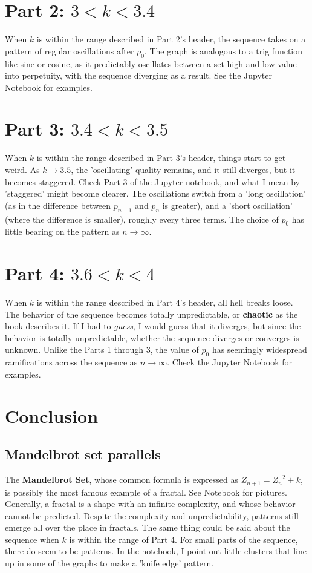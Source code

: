 \documentclass{article}
\begin{document}
\section*{Part 2: $3 < k < 3.4$}
When $k$ is within the range described in Part 2's header, the sequence takes on a pattern of regular oscillations after $p_0$. The graph is analogous to a trig function like sine or cosine, as it predictably oscillates between a set high and low value into perpetuity, with the sequence diverging as a result. See the Jupyter Notebook for examples.
\section*{Part 3: $3.4 < k < 3.5$}
When $k$ is within the range described in Part 3's header, things start to get weird. As $k \rightarrow 3.5$, the 'oscillating' quality remains, and it still diverges, but it becomes staggered. Check Part 3 of the Jupyter notebook, and what I mean by 'staggered' might become clearer. The oscillations switch from a 'long oscillation' (as in the difference between $p_{n+1}$ and $p_n$ is greater), and a 'short oscillation' (where the difference is smaller), roughly every three terms. The choice of $p_0$ has little bearing on the pattern as $n \rightarrow \infty$.
\section*{Part 4: $3.6 < k < 4$}
When $k$ is within the range described in Part 4's header, all hell breaks loose. The behavior of the sequence becomes totally unpredictable, or \textbf{chaotic} as the book describes it. If I had to \textit{guess}, I would guess that it diverges, but since the behavior is totally unpredictable, whether the sequence diverges or converges is unknown. Unlike the Parts 1 through 3, the value of $p_0$ has seemingly widespread ramifications across the sequence as $n \rightarrow \infty$. Check the Jupyter Notebook for examples. 
\section*{Conclusion}
\subsection*{Mandelbrot set parallels}
The \textbf{Mandelbrot Set}, whose common formula is expressed as $Z_{n+1}={Z_n}^2+k$, is possibly the most famous example of a fractal. See Notebook for pictures. Generally, a fractal is a shape with an infinite complexity, and whose behavior cannot be predicted. Despite the complexity and unpredictability, patterns still emerge all over the place in fractals. The same thing could be said about the sequence when $k$ is within the range of Part 4. For small parts of the sequence, there do seem to be patterns. In the notebook, I point out little clusters that line up in some of the graphs to make a 'knife edge' pattern.
\end{document}

